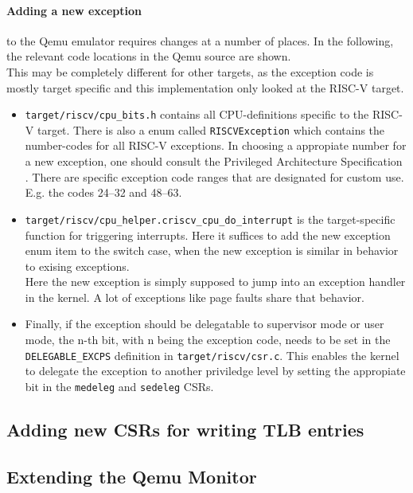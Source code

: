 \paragraph{Adding a new exception}to the Qemu emulator requires changes at a number of places. In the following,
the relevant code locations in the Qemu source are shown.\\
This may be completely different for other targets, as the exception code is mostly target specific and
this implementation only looked at the RISC-V target.
\begin{itemize}
    \item \texttt{target/riscv/cpu\_bits.h} contains all CPU-definitions specific to the RISC-V target.
          There is also a enum called \texttt{RISCVException} which contains the number-codes for all RISC-V exceptions.
          In choosing a appropiate number for a new exception, one should consult the Privileged Architecture Specification \cite{RISCVInstructionSet}.
          There are specific exception code ranges that are designated for custom use. E.g. the codes 24--32 and 48--63.
    \item \texttt{target/riscv/cpu\_helper.c\:riscv\_cpu\_do\_interrupt\(\)} is the target-specific function
          for triggering interrupts. Here it suffices to add the new exception enum item to the switch case, when
          the new exception is similar in behavior to exising exceptions.\\
          Here the new exception is simply supposed to jump into an exception handler in the kernel. A lot of exceptions
          like page faults share that behavior.
    \item Finally, if the exception should be delegatable to supervisor mode or user mode, the n-th bit,
          with n being the exception code, needs to be set in the \texttt{DELEGABLE\_EXCPS} definition in \texttt{target/riscv/csr.c}.
          This enables the kernel to delegate the exception to another priviledge level by setting the appropiate
          bit in the \texttt{medeleg} and \texttt{sedeleg} CSRs.
\end{itemize}
\subsection{Adding new CSRs for writing TLB entries}

\subsection{Extending the Qemu Monitor}


